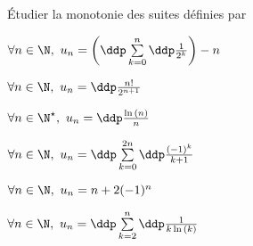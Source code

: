 
\begin{exercice} \; \'Etudier la monotonie des suites d\'efinies par
\begin{enumerate}
\begin{minipage}[t]{0.4\textwidth}
 \item
$\forall n\in\N,\ u_n=\left(\ddp \sum\limits_{k=0}^n \ddp\frac{1}{2^k}\right)-n$ 
\item 
$\forall n\in\N,\ u_n=\ddp\frac{n!}{2^{n+1}}$ 
\item 
$\forall n\in\N^{\star},\ u_n=\ddp\frac{\ln{(n)}}{n}$ 
\end{minipage}
\begin{minipage}[t]{0.4\textwidth}
\item 
$\forall n\in\N,\ u_n=\ddp \sum\limits_{k=0}^{2n}\ddp\frac{(-1)^k}{k+1}$ 
\item 
$\forall n\in\N,\ u_n=n+2(-1)^n$ 
\item $\forall n\in\N,\ u_n=\ddp \sum\limits_{k=2}^{n}\ddp\frac{1}{k\ln{(k)}}$ 
\end{minipage}
\end{enumerate}
\end{exercice}